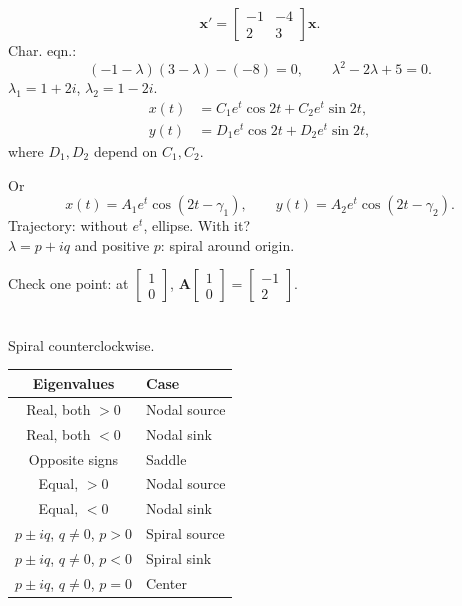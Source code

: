 \begin{example}
  \[
    \mathbf{x}'=
    \begin{bmatrix}
      -1 & -4 \\2&3
    \end{bmatrix}
    \mathbf{x}.
  \]
  Char. eqn.:
  \[
    (-1-\lambda)(3-\lambda)-(-8)=0,\qquad\lambda^2-2\lambda+5=0.
  \]
  $\lambda_1=1+2i$, $\lambda_2=1-2i$.
  \begin{align*}
    x(t) & =C_1e^t\cos2t+C_2e^t\sin2t, \\
    y(t) & =D_1e^t\cos2t+D_2e^t\sin2t,
  \end{align*}
  where $D_1,D_2$ depend on $C_1,C_2$.

  Or
  \[
    x(t)=A_1e^t\cos(2t-\gamma_1),\qquad
    y(t)=A_2e^t\cos(2t-\gamma_2).
  \]
  Trajectory: without $e^t$, ellipse. With it?\\
  $\lambda=p+iq$ and positive $p$: spiral around origin.

  Check one point: at $
    \begin{bmatrix}
      1 \\0
    \end{bmatrix}
  $,
  $\mathbf{A}
    \begin{bmatrix}
      1 \\0
    \end{bmatrix}
    =
    \begin{bmatrix}
      -1 \\2
    \end{bmatrix}
  $.
  \begin{center}
    \\Spiral counterclockwise.
  \end{center}
\end{example}

\begin{center}
  \begin{tabular}{c|l}
    Eigenvalues               & Case          \\\hline
    Real, both $>0$           & Nodal source  \\
    Real, both $<0$           & Nodal sink    \\
    Opposite signs            & Saddle        \\
    Equal, $>0$               & Nodal source  \\
    Equal, $<0$               & Nodal sink    \\
    $p\pm iq$, $q\ne0$, $p>0$ & Spiral source \\
    $p\pm iq$, $q\ne0$, $p<0$ & Spiral sink   \\
    $p\pm iq$, $q\ne0$, $p=0$ & Center
  \end{tabular}
\end{center}

